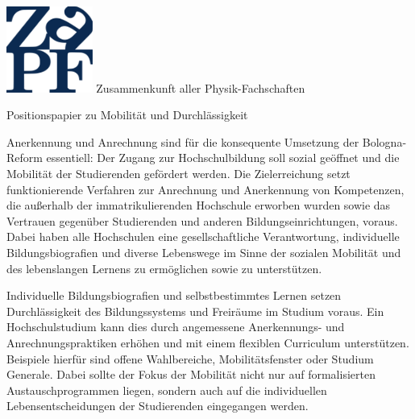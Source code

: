 \documentclass[DIV=calc]{scrartcl}
\begin{document}
\hspace{0.87\textwidth}
\begin{minipage}{120pt}
	\vspace{-1.8cm}
	\includegraphics[width=80pt]{../logo.pdf}
	\centering
	\small Zusammenkunft aller Physik-Fachschaften
\end{minipage}

\begin{center}
  \huge{Positionspapier zu Mobilität und Durchlässigkeit}\vspace{.25\baselineskip}\\
  \normalsize
\end{center}
\vspace{1cm}



Anerkennung und Anrechnung sind für die konsequente Umsetzung der Bologna-Reform essentiell: Der Zugang zur Hochschulbildung soll sozial geöffnet und die Mobilität der Studierenden gefördert werden. Die Zielerreichung setzt funktionierende Verfahren zur Anrechnung und Anerkennung von Kompetenzen, die außerhalb der immatrikulierenden Hochschule erworben wurden sowie das Vertrauen gegenüber Studierenden und anderen Bildungseinrichtungen, voraus. Dabei haben alle Hochschulen eine gesellschaftliche Verantwortung, individuelle Bildungsbiografien und diverse Lebenswege im Sinne der sozialen Mobilität und des lebenslangen Lernens zu ermöglichen sowie zu unterstützen.

Individuelle Bildungsbiografien und selbstbestimmtes Lernen setzen Durchlässigkeit des Bildungssystems und Freiräume im Studium voraus. Ein Hochschulstudium kann dies durch angemessene Anerkennungs- und Anrechnungspraktiken erhöhen und mit einem flexiblen Curriculum unterstützen. Beispiele hierfür sind offene Wahlbereiche, Mobilitätsfenster oder Studium Generale. Dabei sollte der Fokus der Mobilität nicht nur auf formalisierten Austauschprogrammen liegen, sondern auch auf die individuellen Lebensentscheidungen der Studierenden eingegangen werden.
\end{document}
